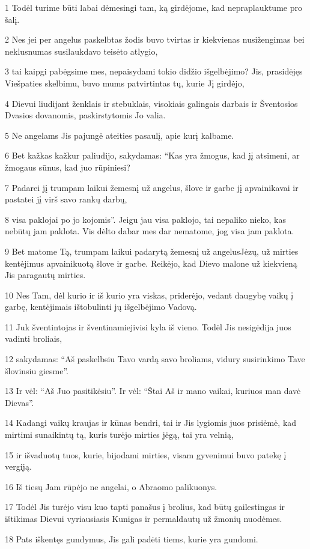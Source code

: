 \par 1 Todėl turime būti labai dėmesingi tam, ką girdėjome, kad nepraplauktume pro šalį. 
\par 2 Nes jei per angelus paskelbtas žodis buvo tvirtas ir kiekvienas nusižengimas bei neklusnumas susilaukdavo teisėto atlygio, 
\par 3 tai kaipgi pabėgsime mes, nepaisydami tokio didžio išgelbėjimo? Jis, prasidėjęs Viešpaties skelbimu, buvo mums patvirtintas tų, kurie Jį girdėjo, 
\par 4 Dievui liudijant ženklais ir stebuklais, visokiais galingais darbais ir Šventosios Dvasios dovanomis, paskirstytomis Jo valia. 
\par 5 Ne angelams Jis pajungė ateities pasaulį, apie kurį kalbame. 
\par 6 Bet kažkas kažkur paliudijo, sakydamas: “Kas yra žmogus, kad jį atsimeni, ar žmogaus sūnus, kad juo rūpiniesi? 
\par 7 Padarei jį trumpam laikui žemesnį už angelus, šlove ir garbe jį apvainikavai ir pastatei jį virš savo rankų darbų, 
\par 8 visa paklojai po jo kojomis”. Jeigu jau visa paklojo, tai nepaliko nieko, kas nebūtų jam paklota. Vis dėlto dabar mes dar nematome, jog visa jam paklota. 
\par 9 Bet matome Tą, trumpam laikui padarytą žemesnį už angelus­Jėzų, už mirties kentėjimus apvainikuotą šlove ir garbe. Reikėjo, kad Dievo malone už kiekvieną Jis paragautų mirties. 
\par 10 Nes Tam, dėl kurio ir iš kurio yra viskas, priderėjo, vedant daugybę vaikų į garbę, kentėjimais ištobulinti jų išgelbėjimo Vadovą. 
\par 11 Juk šventintojas ir šventinamieji­visi kyla iš vieno. Todėl Jis nesigėdija juos vadinti broliais, 
\par 12 sakydamas: “Aš paskelbsiu Tavo vardą savo broliams, vidury susirinkimo Tave šlovinsiu giesme”. 
\par 13 Ir vėl: “Aš Juo pasitikėsiu”. Ir vėl: “Štai Aš ir mano vaikai, kuriuos man davė Dievas”. 
\par 14 Kadangi vaikų kraujas ir kūnas bendri, tai ir Jis lygiomis juos prisiėmė, kad mirtimi sunaikintų tą, kuris turėjo mirties jėgą, tai yra velnią, 
\par 15 ir išvaduotų tuos, kurie, bijodami mirties, visam gyvenimui buvo patekę į vergiją. 
\par 16 Iš tiesų Jam rūpėjo ne angelai, o Abraomo palikuonys. 
\par 17 Todėl Jis turėjo visu kuo tapti panašus į brolius, kad būtų gailestingas ir ištikimas Dievui vyriausiasis Kunigas ir permaldautų už žmonių nuodėmes. 
\par 18 Pats iškentęs gundymus, Jis gali padėti tiems, kurie yra gundomi.


